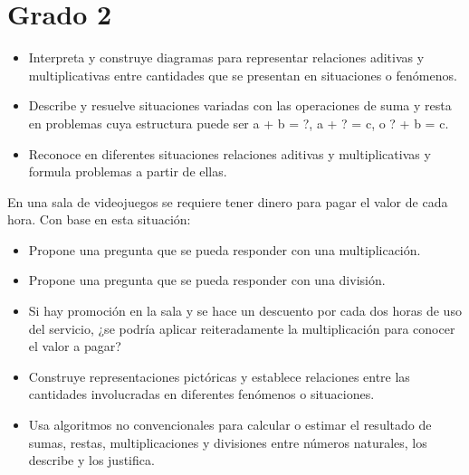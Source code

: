 \section{Grado 2}\label{grado:2}


\evidencias

\begin{itemize}
  \item Interpreta y construye diagramas para representar relaciones aditivas y multiplicativas entre cantidades que se presentan en situaciones o fenómenos.
  \item Describe y resuelve situaciones variadas con las operaciones de suma y resta en problemas cuya estructura puede ser a + b = ?, a + ? = c, o ? + b = c.
  \item Reconoce en diferentes situaciones relaciones aditivas y multiplicativas y formula problemas a partir de ellas.
\end{itemize}

\ejemplo

En una sala de videojuegos se requiere tener dinero para pagar el valor de cada hora. Con base en esta situación:

\begin{itemize}
  \item Propone una pregunta que se pueda responder con una multiplicación.
  \item Propone una pregunta que se pueda responder con una división.
  \item Si hay promoción en la sala y se hace un descuento por cada dos horas de uso del servicio, ¿se podría aplicar reiteradamente la multiplicación para conocer el valor a pagar?
\end{itemize}


\evidencias

\begin{itemize}
  \item Construye representaciones pictóricas y establece relaciones entre las cantidades involucradas en diferentes fenómenos o situaciones.
  \item Usa algoritmos no convencionales para calcular o estimar el resultado de sumas, restas, multiplicaciones y divisiones entre números naturales, los describe y los justifica.
\end{itemize}

